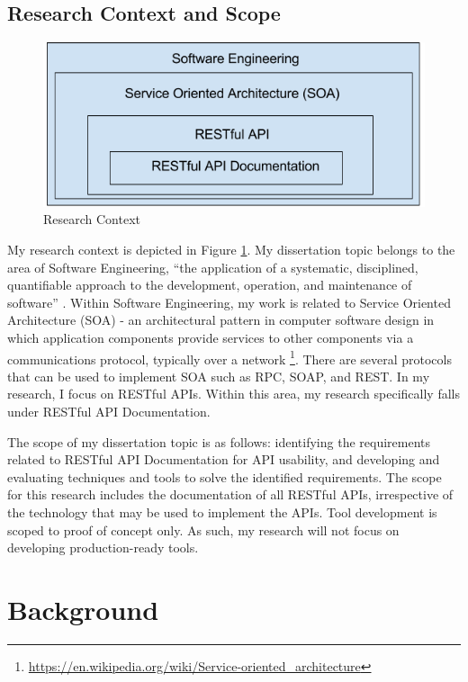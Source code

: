 \documentclass[11pt,oneside]{book}
\begin{document}
\section{Research Context and Scope}

\begin{figure}[bth]
  \includegraphics[width=\linewidth]{context.png}
  \caption{Research Context}
  \label{fig:context}
\end{figure}

My research context is depicted in Figure \ref{fig:context}. My dissertation topic belongs to the area of Software Engineering, “the application of a systematic, disciplined, quantifiable approach to the development, operation, and maintenance of software” \cite{iee_std}. Within Software Engineering, my work is related to Service Oriented Architecture (SOA) -  an architectural pattern in computer software design in which application components provide services to other components via a communications protocol, typically over a network \footnote{\url{https://en.wikipedia.org/wiki/Service-oriented_architecture}}. There are several protocols that can be used to implement SOA such as RPC, SOAP, and REST. In my research, I focus on RESTful APIs. Within this area, my research specifically falls under RESTful API Documentation.

The scope of my dissertation topic is as follows: identifying the requirements related to RESTful API Documentation for API usability, and developing and evaluating techniques and tools to solve the identified requirements. The scope for this research includes the documentation of all RESTful APIs, irrespective of the technology that may be used to implement the APIs. Tool development is scoped to proof of concept only. As such, my research will not focus on developing production-ready tools.

\chapter{Background}
\end{document}
